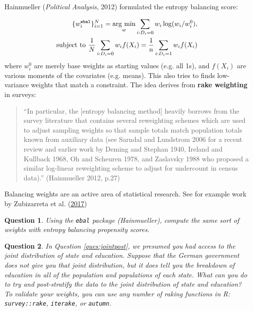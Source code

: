 \documentclass[10pt, letterpaper]{article}
\theoremstyle{mytheoremstyle}
\newtheorem{question}{Question}[section]
\begin{document}
Hainmueller (\emph{Political Analysis}, 2012) formulated the entropy balancing score:

\begin{align}
\{w^{\texttt{ebal}}_i\}^N_{i=1} = \mathop{\rm arg~min}\limits_{w} \sum_{i: D_i = 0} w_i\log(w_i / w^{0}_i),\\
\text{subject to } \frac{1}{N}\sum_{i:  D_i=0}w_i f(X_i) =  \frac{1}{n}\sum_{i: D_i=1}w_i f(X_i)
\end{align}
where $w^{0}_i$ are merely base weights as starting values (e.g. all 1s), and $f(X_i)$ are various moments of the covariates (e.g. means). This also tries to finds low-variance weights that match a constraint. The idea derives from \textbf{rake weighting} in surveys:

\begin{quote}
 ``In particular, the [entropy balancing method] heavily borrows from the survey literature that contains several reweighting schemes which are used to adjust sampling weights so that sample totals match population totals known from auxiliary data (see Sarndal and Lundstrom 2006 for a recent review and earlier work by Deming and Stephan 1940, Ireland and Kullback 1968, Oh and Scheuren 1978, and Zaslavsky 1988 who proposed a similar log-linear reweighting scheme to adjust for undercount in census data).'' (Hainmueller 2012, p.27)
\end{quote}

\noindent Balancing weights are an active area of statistical research. See for example work by Zubizarreta et al. (\href{http://www.jrzubizarreta.com/minimal.pdf}{2017})

\begin{question}
Using the \texttt{ebal} package (Hainmueller), compute the same sort of weights with entropy balancing propensity scores.
\end{question}

\begin{question}
In Question \ref{ques:jointpost}, we presumed you had access to the joint distribution of state and education. Suppose that the German government does not give you that joint distribution, but it \emph{does} tell you the breakdown of education in all of the population and populations of each state. What can you do to try and post-stratify the data to the joint distribution of state and education? To validate your weights, you can use any number of raking functions in R: \texttt{survey::rake}, \texttt{iterake}, or \texttt{autumn}.
\end{question}
\end{document}
